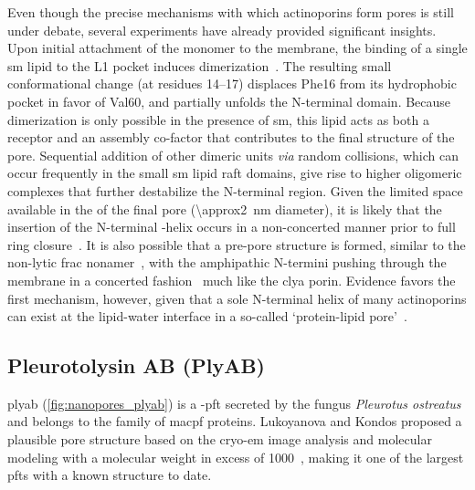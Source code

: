 Even though the precise mechanisms with which actinoporins form pores is still under debate, several
experiments have already provided significant insights. Upon initial attachment of the monomer to the
membrane, the binding of a single \gls{sm} lipid to the L1 pocket induces dimerization~\cite{Tanaka-2015}. The
resulting small conformational change (at residues 14--17) displaces Phe16 from its hydrophobic pocket in
favor of Val60, and partially unfolds the N-terminal domain. Because dimerization is only possible in the
presence of \gls{sm}, this lipid acts as both a receptor and an assembly co-factor that contributes to the
final structure of the pore. Sequential addition of other dimeric units \textit{via} random collisions, which
can occur frequently in the small \gls{sm} lipid raft domains, give rise to higher oligomeric complexes that
further destabilize the N-terminal region. Given the limited space available in the \lumen{} of the final pore
(\SI{\approx2}{\nm} diameter), it is likely that the insertion of the N-terminal \ta-helix occurs in a
non-concerted manner prior to full ring closure~\cite{Cosentino-2016}. It is also possible that a pre-pore
structure is formed, similar to the non-lytic \gls{frac} nonamer~\cite{Mechaly-2011}, with the amphipathic
N-termini pushing through the membrane in a concerted fashion~\cite{Tanaka-2015,Rojko-2016} much like the
\gls{clya} porin. Evidence favors the first mechanism, however, given that a sole N-terminal helix of many
actinoporins can exist at the lipid-water interface in a so-called `protein-lipid pore'~\cite{Cosentino-2016}.

%
\clearpage
%

%
\subsection{Pleurotolysin AB (PlyAB)}
%
\label{sec:np:plyab}
%

\Gls{plyab} (\cref{fig:nanopores_plyab}) is a \tb-\gls{pft} secreted by the fungus \textit{Pleurotus
ostreatus} and belongs to the family of \gls{macpf} proteins. Lukoyanova and Kondos \etal{} proposed a
plausible pore structure based on the \gls{cryo-em} image analysis and molecular modeling with a molecular
weight in excess of \SI{1000}{\kDa}~\cite{Lukoyanova-Kondos-2015}, making it one of the largest \glspl{pft}
with a known structure to date.

